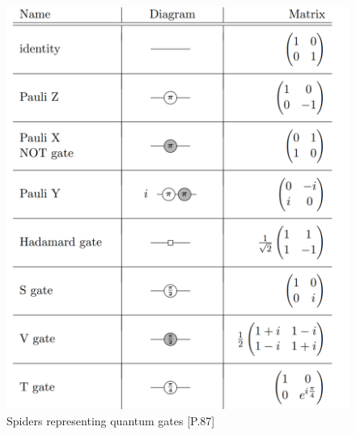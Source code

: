 \begin{figure}
    \includegraphics[width=\linewidth]{images/single_spider_unitaries.png}
    \caption{Spiders representing quantum gates
            {\cite{vandewetering2020zxcalculus}[P.87]}}
    \label{fig:spiders}
\end{figure}






